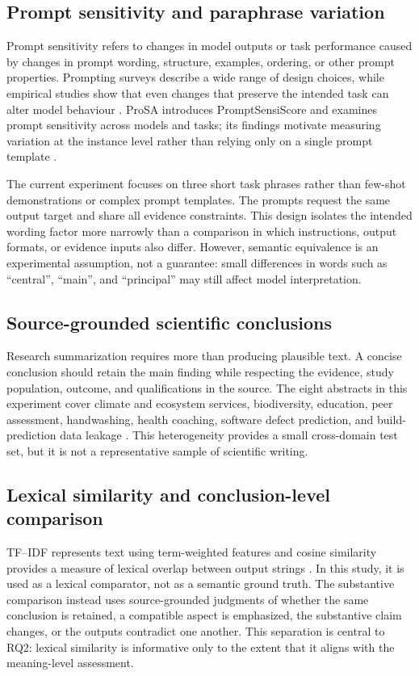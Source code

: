 \documentclass[acmsmall,screen,nonacm]{acmart}
\begin{document}
\subsection{Prompt sensitivity and paraphrase variation}
Prompt sensitivity refers to changes in model outputs or task performance caused by changes in prompt wording, structure, examples, ordering, or other prompt properties. Prompting surveys describe a wide range of design choices, while empirical studies show that even changes that preserve the intended task can alter model behaviour \cite{schulhoff2024,lu2022}. ProSA introduces PromptSensiScore and examines prompt sensitivity across models and tasks; its findings motivate measuring variation at the instance level rather than relying only on a single prompt template \cite{zhuo2024}.

The current experiment focuses on three short task phrases rather than few-shot demonstrations or complex prompt templates. The prompts request the same output target and share all evidence constraints. This design isolates the intended wording factor more narrowly than a comparison in which instructions, output formats, or evidence inputs also differ. However, semantic equivalence is an experimental assumption, not a guarantee: small differences in words such as ``central'', ``main'', and ``principal'' may still affect model interpretation.

\subsection{Source-grounded scientific conclusions}
Research summarization requires more than producing plausible text. A concise conclusion should retain the main finding while respecting the evidence, study population, outcome, and qualifications in the source. The eight abstracts in this experiment cover climate and ecosystem services, biodiversity, education, peer assessment, handwashing, health coaching, software defect prediction, and build-prediction data leakage \cite{delos2025,jenkins2021,pandey2023,sun2015,tidwell2020,dwinger2020,munir2021,mishra2026}. This heterogeneity provides a small cross-domain test set, but it is not a representative sample of scientific writing.

\subsection{Lexical similarity and conclusion-level comparison}
TF--IDF represents text using term-weighted features and cosine similarity provides a measure of lexical overlap between output strings \cite{manning2008}. In this study, it is used as a lexical comparator, not as a semantic ground truth. The substantive comparison instead uses source-grounded judgments of whether the same conclusion is retained, a compatible aspect is emphasized, the substantive claim changes, or the outputs contradict one another. This separation is central to RQ2: lexical similarity is informative only to the extent that it aligns with the meaning-level assessment.
\end{document}
